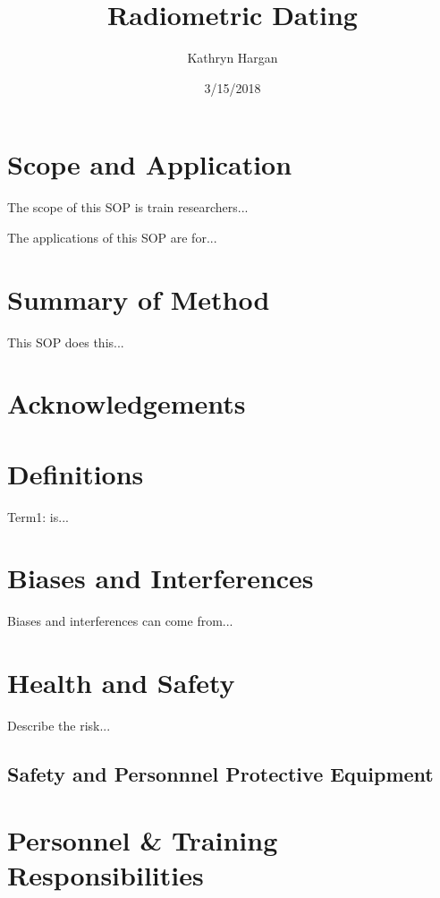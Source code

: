 \documentclass[12pt]{../SOP3}\usepackage[]{graphicx}\usepackage[]{color}
\title{Radiometric Dating}
\date{3/15/2018}
\author{Kathryn Hargan}
\begin{document}
\maketitle

\section{Scope and Application}

\NP The scope of this SOP is train researchers...

\NP The applications of this SOP are for...

\section{Summary of Method}

\NP This SOP does this...

\tableofcontents

\newpage

\section{Acknowledgements}

\section{Definitions}

\NP Term1: is...

\section{Biases and Interferences}

\NP Biases and interferences can come from...

\section{Health and Safety}

\NP Describe the risk...


\subsection{Safety and Personnnel Protective Equipment}


\section{Personnel \& Training Responsibilities}
\end{document}
